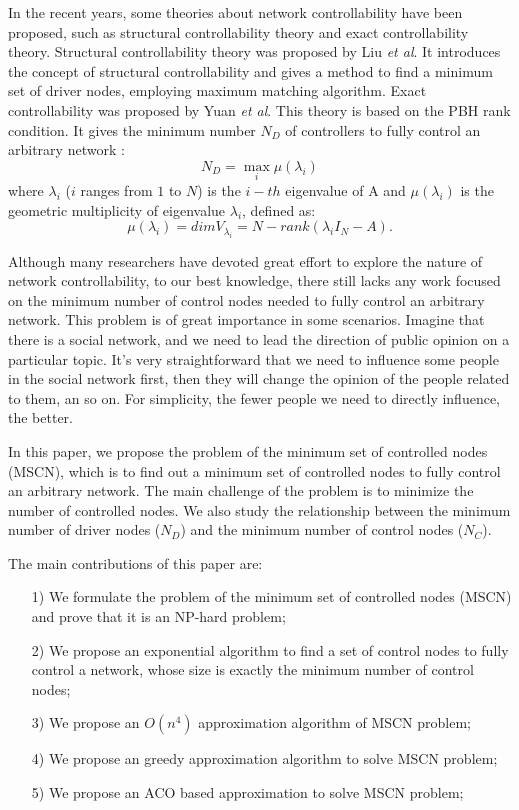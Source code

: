 \documentclass[10pt, conference, letterpaper]{IEEEtran}
\begin{document}
In the recent years, some theories about network controllability have been proposed, such as structural controllability theory and exact controllability theory. Structural controllability theory was proposed by Liu \emph{et al}. It introduces the concept of structural controllability and gives a method to find a minimum set of driver nodes, employing maximum matching algorithm. Exact controllability was
proposed by Yuan \emph{et al}. This theory is based on the PBH rank condition. It gives the minimum number $ N_D $ of controllers to fully control an arbitrary network :
\begin{equation}
N_D = \max_i {\mu(\lambda_i)}
\end{equation}
where $\lambda_i$ ($i$ ranges from $1$ to $N$) is the $i-th$ eigenvalue of A and $\mu(\lambda_i)$ is the geometric multiplicity of eigenvalue $\lambda_i$, defined as:
\begin{equation}
\mu(\lambda_i) = dimV_{\lambda_i} = N - rank(\lambda_iI_N-A).
\end{equation}

Although many researchers have devoted great effort to explore the nature of network controllability, to our best knowledge, there still lacks any work focused on the minimum number of control nodes needed to fully control an arbitrary network. This problem is of great importance in some scenarios. Imagine that there is a social network, and we need to lead the direction of public opinion on a particular topic. It's very straightforward that we need to influence some people in the social network first, then they will change the opinion of the people related to them, an so on. For simplicity, the fewer people we need to directly influence, the better.

In this paper, we propose the problem of the minimum set of controlled nodes (MSCN), which is to find out a minimum set of controlled nodes to fully control an arbitrary network. The main challenge of the problem is to minimize the number of controlled nodes. We also study the relationship between the minimum number of driver nodes ($N_D$) and the minimum number of control nodes ($N_C$).

The main contributions of this paper are:
\begin{itemize}
\item[1)] We formulate the problem of the minimum set of controlled nodes (MSCN) and prove that it is an NP-hard problem;
\item[2)] We propose an exponential algorithm to find a set of control nodes to fully control a network, whose size is exactly the minimum number of control nodes;
\item[3)] We propose an $O(n^4)$ approximation algorithm of MSCN problem;
\item[4)] We propose an greedy approximation algorithm to solve MSCN problem;
\item[5)] We propose an ACO based approximation to solve MSCN problem;
\end{itemize}
\end{document}

